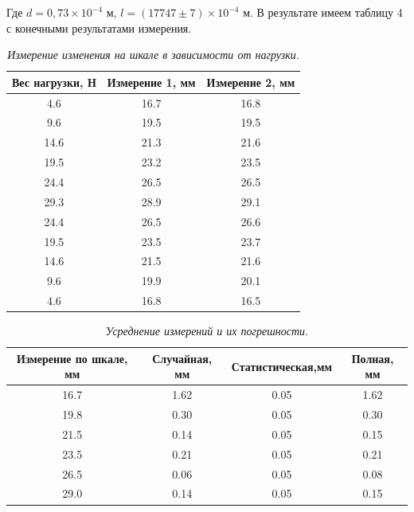 \documentclass[a4paper,12pt]{report}
\begin{document}
Где $d = 0,73\times 10^{-4}$ м, $l = (17747\pm7)\times 10^{-4}$ м. В результате имеем таблицу 4 с конечными результатами измерения.


\begin{table}[h]
\begin{center}
\begin{tabular}{|c|c|c|}
\hline
Вес   нагрузки, Н & Измерение 1, мм & Измерение 2, мм \\ \hline
4.6               & 16.7            & 16.8            \\ \hline
9.6               & 19.5            & 19.5            \\ \hline
14.6              & 21.3            & 21.6            \\ \hline
19.5              & 23.2            & 23.5            \\ \hline
24.4              & 26.5            & 26.5            \\ \hline
29.3              & 28.9            & 29.1            \\ \hline
24.4              & 26.5            & 26.6            \\ \hline
19.5              & 23.5            & 23.7            \\ \hline
14.6              & 21.5            & 21.6            \\ \hline
9.6               & 19.9            & 20.1            \\ \hline
4.6               & 16.8            & 16.5            \\ \hline
\end{tabular}
\end{center}
\caption{\textit{Измерение изменения на шкале в зависимости от нагрузки.}}
\end{table}

\begin{table}[h!]
\begin{center}
\begin{tabular}{|c|c|c|c|}
\hline
Измерение по шкале, мм & Случайная, мм & Статистическая,мм & Полная, мм \\ \hline
16.7                   & 1.62          & 0.05              & 1.62       \\ \hline
19.8                   & 0.30          & 0.05              & 0.30       \\ \hline
21.5                   & 0.14          & 0.05              & 0.15       \\ \hline
23.5                   & 0.21          & 0.05              & 0.21       \\ \hline
26.5                   & 0.06          & 0.05              & 0.08       \\ \hline
29.0                   & 0.14          & 0.05              & 0.15       \\ \hline
\end{tabular}
\end{center}
\caption{\textit{Усреднение измерений и их погрешности.}}
\end{table}
\end{document}
